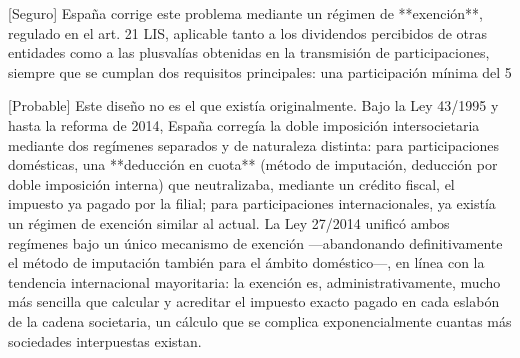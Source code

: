 \documentclass[10pt,a4paper]{article}
\begin{document}
[Seguro] España corrige este problema mediante un régimen de **exención**, regulado en el art. 21 LIS, aplicable tanto a los dividendos percibidos de otras entidades como a las plusvalías obtenidas en la transmisión de participaciones, siempre que se cumplan dos requisitos principales: una participación mínima del 5%

[Probable] Este diseño no es el que existía originalmente. Bajo la Ley 43/1995 y hasta la reforma de 2014, España corregía la doble imposición intersocietaria mediante dos regímenes separados y de naturaleza distinta: para participaciones domésticas, una **deducción en cuota** (método de imputación, deducción por doble imposición interna) que neutralizaba, mediante un crédito fiscal, el impuesto ya pagado por la filial; para participaciones internacionales, ya existía un régimen de exención similar al actual. La Ley 27/2014 unificó ambos regímenes bajo un único mecanismo de exención —abandonando definitivamente el método de imputación también para el ámbito doméstico—, en línea con la tendencia internacional mayoritaria: la exención es, administrativamente, mucho más sencilla que calcular y acreditar el impuesto exacto pagado en cada eslabón de la cadena societaria, un cálculo que se complica exponencialmente cuantas más sociedades interpuestas existan.
\end{document}

